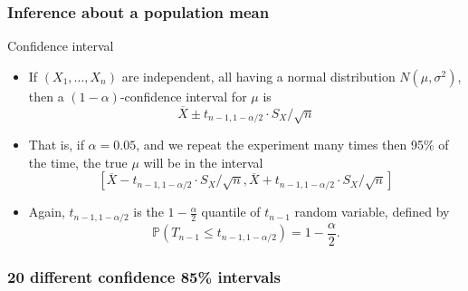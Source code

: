 \documentclass[handout]{beamer}
\newcommand{\Pp}{\mathbb{P}}
\begin{document}
   \begin{frame} \frametitle{Inference about a population mean}

   \begin{block}
   {Confidence interval}
   \begin{itemize}
   \item     If $(X_1, \dots, X_n)$ are independent, all having a normal distribution  $N(\mu, \sigma^2)$, then a $(1 - \alpha)$-confidence interval for $\mu$ is
   $$
   \overline{ X} \pm t_{n-1, 1 - \alpha/2}\cdot S_X / \sqrt{n}
   $$
   \item That is, if $\alpha=0.05$, and we repeat the experiment
   many times then 95\% of the time,
   the true $\mu$ will be in the interval
   $$
   [\overline{ X} - t_{n-1, 1 - \alpha/2}\cdot S_X / \sqrt{n},\overline{ X} + t_{n-1, 1 - \alpha/2}\cdot S_X / \sqrt{n}]
   $$
   \item Again, $t_{n-1, 1-\alpha/2}$ is the $1-\frac \alpha 2$ quantile of $t_{n-1}$ random variable, defined by
   $$
   \Pp(T_{n-1} \leq t_{n-1,1-\alpha/2}) = 1 - \frac\alpha 2.$$
   \end{itemize}
   \end{block}
   \end{frame}



   \begin{frame}
   \frametitle{20 different confidence 85\% intervals}
   \begin{center}
   \end{center}

   \end{frame}
\end{document}
